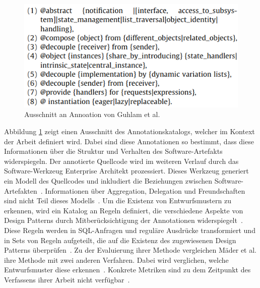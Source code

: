 \begin{figure}[h]
    \centering
    \includegraphics{figures/annotations.png}
    \caption{Ausschnitt an Annoation von Guhlam et al.}
    \label{fig:annotations}
\end{figure}

Abbildung \ref{fig:annotations} zeigt einen Ausschnitt des Annotationskatalogs, welcher im Kontext der Arbeit definiert wird. Dabei sind diese Annotationen so bestimmt, dass diese Informationen über die Struktur und Verhalten des Software-Artefakts widerspiegeln.
Der annotierte Quellcode wird im weiteren Verlauf durch das Software-Werkzeug Enterprise Architekt prozessiert. Dieses Werkzeug generiert ein Modell des Quellcodes und inkludiert die Beziehungen zwischen Software-Artefakten~\cite[S. 521]{Ghula-2010}. Informationen über Aggregation, Delegation und Freundschaften sind nicht Teil dieses Modells~\cite[S. 521]{Ghula-2010}.
Um die Existenz von Entwurfsmustern zu erkennen, wird ein Katalog an Regeln definiert, die verschiedene Aspekte von Design Patterns durch Mitberücksichtigung der Annotationen widerspiegelt~\cite[S. 523]{Ghula-2010}. Diese Regeln werden in SQL-Anfragen und reguläre Ausdrücke transformiert und in Sets von Regeln aufgeteilt, die auf die Existenz des zugewiesenen Design Patterns überprüfen~\cite[S. 523]{Ghula-2010}.  
Zu der Evaluierung ihrer Methode vergleichen Mäder et al. ihre Methode mit zwei anderen Verfahren. Dabei wird verglichen, welche Entwurfsmuster diese erkennen~\cite[S. 525]{Ghula-2010}.
Konkrete Metriken sind zu dem Zeitpunkt des Verfassens ihrer Arbeit nicht verfügbar~\cite[S. 525]{Ghula-2010}.

\pagebreak

